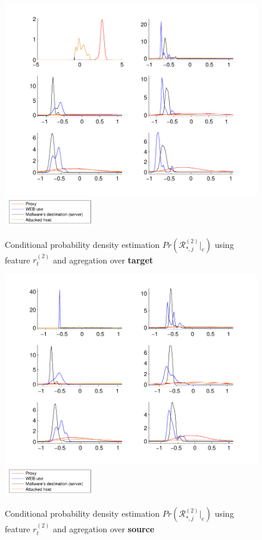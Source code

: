 \documentclass[a4paper]{IEEEtran}
\begin{document}
\begin{figure}[t!]%
  \centering
  \includegraphics[width=140mm]{dens_dst_logp}
      \includegraphics[width=40mm]{legend}
  \caption{Conditional probability density estimation $Pr ( \mathcal{R}^{(2)}_{*,j}|_e ) $ using feature $r_t^{(2)}$ and agregation over \textbf{target}}
  \label{fig:dens_dst_logp}
\end{figure}
\begin{figure}[t!]%
  \centering
  \includegraphics[width=140mm]{dens_src_logp}
  \includegraphics[width=40mm]{legend}
  \caption{Conditional probability density estimation $Pr ( \mathcal{R}^{(2)}_{*,j}|_e ) $ using feature $r_t^{(2)}$ and agregation over \textbf{source}}
  \label{fig:dens_src_logp}
\end{figure}
\end{document}
